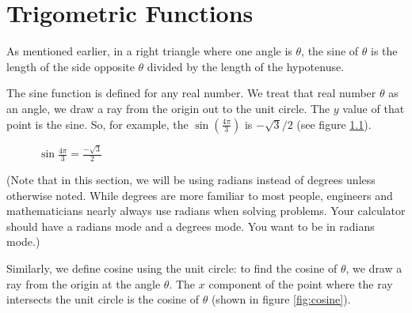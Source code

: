 \chapter{Trigometric Functions}

As mentioned earlier, in a right triangle where one angle is $\theta$,
the sine of $\theta$ is the length of the side opposite $\theta$
divided by the length of the hypotenuse.

The sine function is defined for any real number. We treat that real number
$\theta$ as an angle, we draw a ray from the origin out to the unit
circle. The $y$ value of that point is the sine. So, for example,
the $\sin(\frac{4\pi}{3})$ is $-\sqrt{3}/2$ (see figure \ref{fig:sine}).

\begin{figure}[htbp]
\centering
{}
\caption{$\sin{\frac{4\pi}{3}} = \frac{-\sqrt{3}}{2}$}
\label{fig:sine}
\end{figure}


(Note that in this section, we will be using radians instead of
degrees unless otherwise noted. While degrees are more familiar to most
people, engineers and mathematicians nearly always use radians when
solving problems. Your calculator should have a radians mode and a
degrees mode. You want to be in radians mode.)

Similarly, we define cosine using the unit circle: to find the cosine
of $\theta$, we draw a ray from the origin at the angle $\theta$. The
$x$ component of the point where the ray intersects the unit circle is
the cosine of $\theta$ (shown in figure \ref{fig:cosine}).

